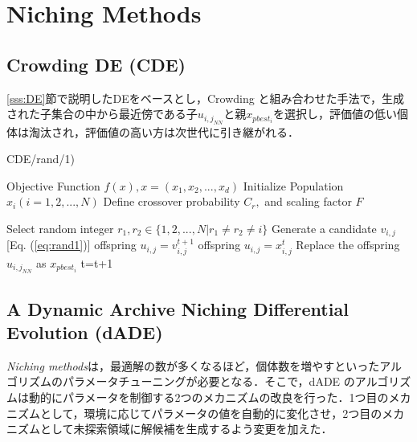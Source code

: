\documentclass[a4j,11pt]{jarticle}
\begin{document}

\newpage
\section{Niching Methods}
\label{sec:nm}


\subsection{Crowding DE (CDE)}
\label{ss:cde}
\ref{sss:DE}節で説明したDEをベースとし，Crowding \cite{Crowding} と組み合わせた手法で，生成された子集合の中から最近傍である子$u_{{i,j}_{NN}}$と親$x_{pbest_i}$を選択し，評価値の低い個体は淘汰され，評価値の高い方は次世代に引き継がれる．

\begin{algorithm}[H]
\caption{CDE/rand/1)}
\label{code:cde}
\begin{algorithmic}[3]
\REQUIRE Objective Function $f(x), x=(x_1,x_2,...,x_d)$
\STATE Initialize Population $x_i (i=1,2,...,N)$ 
\STATE Define crossover probability $C_r,$ and scaling factor $F$

\STATE Select random integer $r_1, r_2 \in \{ 1,2,..., N| r_1 \neq r_2 \neq i\}$
\STATE Generate a candidate $v_{i,j}$  [Eq. (\ref{eq:rand1})]
\STATE offspring $u_{i,j} = v_{i,j}^{t+1}$
\STATE offspring $u_{i,j} = x_{i,j}^t$
\ENDIF
\ENDFOR
{}
\STATE Replace the offspring $u_{{i,j}_{NN}}$ as $x_{pbest_i}$
\ENDIF
\ENDFOR
\STATE t=t+1
\ENDWHILE
\end{algorithmic}
\end{algorithm}

\subsection{A Dynamic Archive Niching Differential Evolution (dADE)}
\label{ss:dADE}
{\it Niching methods}は，最適解の数が多くなるほど，個体数を増やすといったアルゴリズムのパラメータチューニングが必要となる．そこで，dADE \cite{dADE} のアルゴリズムは動的にパラメータを制御する2つのメカニズムの改良を行った．1つ目のメカニズムとして，環境に応じてパラメータの値を自動的に変化させ，2つ目のメカニズムとして未探索領域に解候補を生成するよう変更を加えた．
\end{document}
